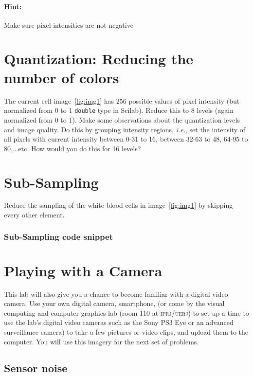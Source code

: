 \documentclass[a4paper]{article}
\newcommand{\code}[2]{
 \vspace{1em}
 \subsubsection*{#1}
 
}
\newcommand{\ie}{{\it i.e.}}
\begin{document}
\paragraph{Hint:} Make sure pixel intensities are not negative

\section{Quantization: Reducing the number of colors}
The current cell image~\ref{fig:img1} has 256 possible values of pixel
intensity (but normalized from 0 to 1 \texttt{double} type in Scilab). 
Reduce
this to 8 levels (again normalized from 0 to 1). Make some observations about the quantization levels and image
quality. Do this by grouping intensity regions, \ie, set the intensity of all
pixels with current intensity between 0-31 to 16, between 32-63 to 48, 64-95 to
80,...etc.  How would you do this for 16 levels?

\section{Sub-Sampling}
Reduce the sampling of the white blood cells in image~\ref{fig:img1} by skipping
every other element.
\code{Sub-Sampling  code snippet}{sampling-code.sci}

\section{Playing with a Camera}

This lab will also give you a chance to become familiar with a digital video camera.
Use your own digital camera, smartphone, (or come by the visual computing and
computer graphics lab (room 110 at
\textsc{iprj/uerj}) to set up
a time to use the lab's digital video cameras such as the Sony PS3 Eye or 
an advanced surveillance camera) to take a few pictures or video clips, and upload them
to the computer. You will use this imagery for the next set of problems.

\subsection{Sensor noise}
\end{document}
